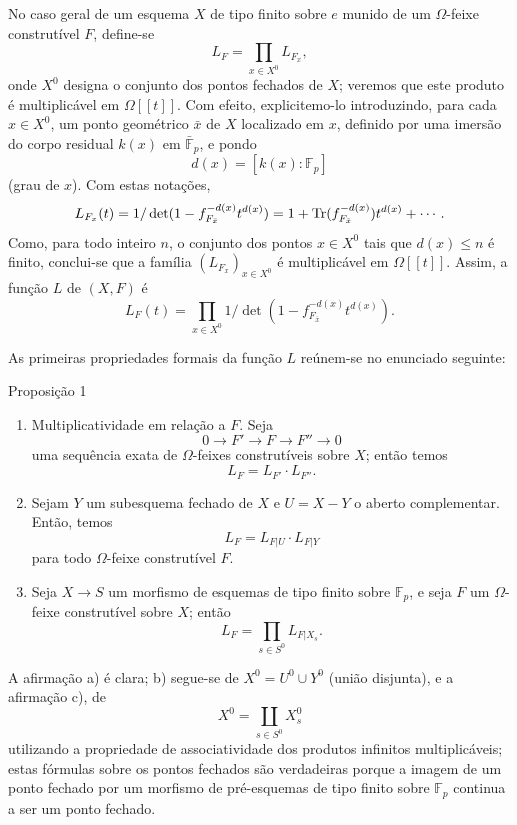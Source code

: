 No caso geral de um esquema $X$ de tipo finito sobre $e$ munido de um $\Omega$-feixe construtível $F$, define-se
\[
L_F=\prod_{x\in X^0}L_{F_x},
\]
onde $X^0$ designa o conjunto dos pontos fechados de $X$; veremos que este produto é multiplicável em $\Omega[[t]]$. Com efeito, explicitemo-lo introduzindo, para cada $x\in X^0$, um ponto geométrico $\bar x$ de $X$ localizado em $x$, definido por uma imersão do corpo residual $k(x)$ em $\bar{\mathbb F}_p$, e pondo
\[
d(x)=[k(x):\mathbb F_p]
\]
(grau de $x$). Com estas notações,
\[
L_{F_x}(t)=1/\det(1-f_{F_{\bar x}}^{-d(x)}t^{d(x)})
 =1+\operatorname{Tr}(f_{F_{\bar x}}^{-d(x)})t^{d(x)}+\cdots .
\]
Como, para todo inteiro $n$, o conjunto dos pontos $x\in X^0$ tais que $d(x)\le n$ é finito, conclui-se que a família $(L_{F_x})_{x\in X^0}$ é multiplicável em $\Omega[[t]]$. Assim, a função $L$ de $(X,F)$ é
\[
L_F(t)=\prod_{x\in X^0}1/\det(1-f_{F_{\bar x}}^{-d(x)}t^{d(x)}).
\]

As primeiras propriedades formais da função $L$ reúnem-se no enunciado seguinte:

\begin{statement}{Proposição 1}
\begin{enumerate}[label=\alph*)]
\item Multiplicatividade em relação a $F$. Seja
\[
0\longrightarrow F'\longrightarrow F\longrightarrow F''\longrightarrow0
\]
uma sequência exata de $\Omega$-feixes construtíveis sobre $X$; então temos
\[
L_F=L_{F'}\cdot L_{F''}.
\]
\item Sejam $Y$ um subesquema fechado de $X$ e $U=X-Y$ o aberto complementar. Então, temos
\[
L_F=L_{F|U}\cdot L_{F|Y}
\]
para todo $\Omega$-feixe construtível $F$.
\item Seja $X\to S$ um morfismo de esquemas de tipo finito sobre $\mathbb F_p$, e seja $F$ um $\Omega$-feixe construtível sobre $X$; então
\[
L_F=\prod_{s\in S^0}L_{F|X_s}.
\]
\end{enumerate}
\end{statement}

A afirmação a) é clara; b) segue-se de $X^0=U^0\cup Y^0$ (união disjunta), e a afirmação c), de
\[
X^0=\coprod_{s\in S^0}X_s^0
\]
utilizando a propriedade de associatividade dos produtos infinitos multiplicáveis; estas fórmulas sobre os pontos fechados são verdadeiras porque a imagem de um ponto fechado por um morfismo de pré-esquemas de tipo finito sobre $\mathbb F_p$ continua a ser um ponto fechado.
